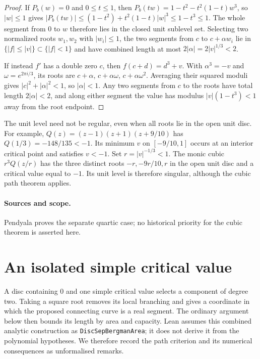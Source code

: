 \begin{proof}
If $P_b(w)=0$ and $0\le t\le1$, then
$P_b(tw)=1-t^2-t^2(1-t)w^3$, so $|w|\le1$ gives
$|P_b(tw)|\le(1-t^2)+t^2(1-t)|w|^3\le1-t^3\le1$.  The whole segment from $0$
to $w$ therefore lies in the closed unit sublevel set.  Selecting two normalized roots $w_1,w_2$ with
$|w_i|\le1$, the two segments from $c$ to $c+\alpha w_i$ lie in
$\{|f|\le|v|\}\subset\{|f|<1\}$ and have combined length at most
$2|\alpha|=2|v|^{1/3}<2$.

If instead $f'$ has a double zero $c$, then $f(c+d)=d^3+v$. With $\alpha^3=-v$ and
$\omega=e^{2\pi i/3}$, its roots are
$c+\alpha$, $c+\alpha\omega$, $c+\alpha\omega^2$.  Averaging their squared
moduli gives $|c|^2+|\alpha|^2<1$, so $|\alpha|<1$. Any two segments from
$c$ to the roots have total length $2|\alpha|<2$, and along either segment
the value has modulus
$|v|(1-t^3)<1$ away from the root endpoint.
\end{proof}

The unit level need not be regular, even when all roots lie in the open
unit disc. For example,
$Q(z)=(z-1)(z+1)(z+9/10)$ has $Q(1/3)=-148/135<-1$.
Its minimum $v$ on $[-9/10,1]$ occurs at an interior critical point and
satisfies $v<-1$. Set $r=|v|^{-1/3}<1$. The monic cubic
$r^3Q(z/r)$ has the three distinct roots $-r,-9r/10,r$ in the open unit
disc and a critical value equal to $-1$. Its unit level is therefore
singular, although the cubic path theorem applies.

\paragraph{Sources and scope.}
\label{bdry:degree-three}
Pendyala \cite[Theorem~1, pp.~1--3]{june2026} proves the separate quartic
case; no historical priority for the cubic theorem is asserted here.

\section{An isolated simple critical value}
\label{sec:critical-value-separation}

A disc containing $0$ and one simple critical value selects a component
of degree two. Taking a square root removes its local branching and
gives a coordinate in which the proposed connecting curve is a real
segment. The ordinary argument
below then bounds its length by area and capacity. Lean assumes this
combined analytic construction as \texttt{DiscSepBergmanArea}; it does
not derive it from the polynomial hypotheses. We therefore record the
path criterion and its numerical consequences as unformalised remarks.

